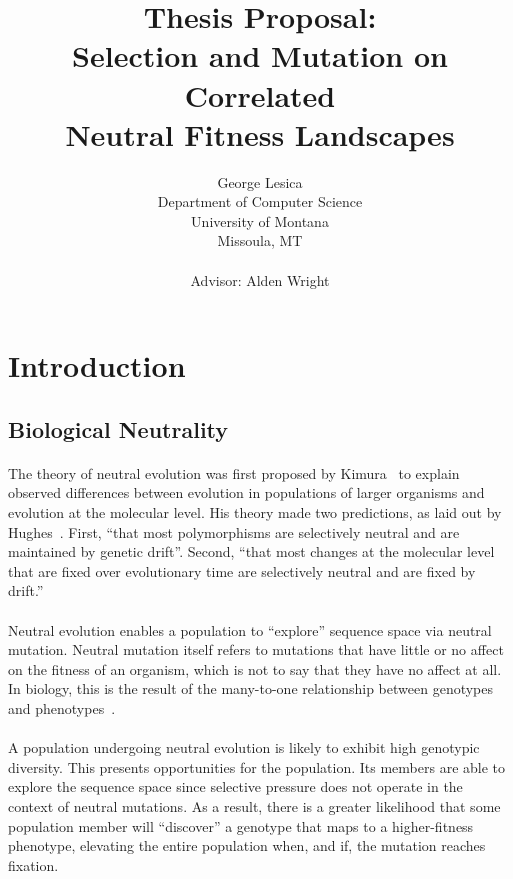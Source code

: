 \documentclass[12pt,letterpaper,titlepage]{article}
\title{Thesis Proposal:\\
Selection and Mutation on Correlated\\
Neutral Fitness Landscapes}
\author{George Lesica\\
Department of Computer Science\\
University of Montana\\
Missoula, MT\\
\\
Advisor: Alden Wright}
\begin{document}
\maketitle

\section{Introduction}

\subsection{Biological Neutrality}

\paragraph{}
The theory of neutral evolution was first proposed by Kimura~\cite{Kimura1984}
to explain observed differences between evolution in populations of larger
organisms and evolution at the molecular level. His theory made two
predictions, as laid out by Hughes~\cite{Hughes2007}. First, ``that most
polymorphisms are selectively neutral and are maintained by genetic drift''.
Second, ``that most changes at the molecular level that are fixed over
evolutionary time are selectively neutral and are fixed by drift.''

\paragraph{}
Neutral evolution enables a population to ``explore'' sequence space via
neutral mutation. Neutral mutation itself refers to mutations that have little or
no affect on the fitness of an organism, which is not to say that they have no
affect at all. In biology, this is the result of the many-to-one relationship
between genotypes and phenotypes~\cite{Newman1998}.

\paragraph{}
A population undergoing neutral evolution is likely to exhibit high genotypic
diversity. This presents opportunities for the population. Its members are able
to explore the sequence space since selective pressure does not operate in the
context of neutral mutations. As a result, there is a greater likelihood that
some population member will ``discover'' a genotype that maps to a
higher-fitness phenotype, elevating the entire population when, and if, the
mutation reaches fixation.
\end{document}
